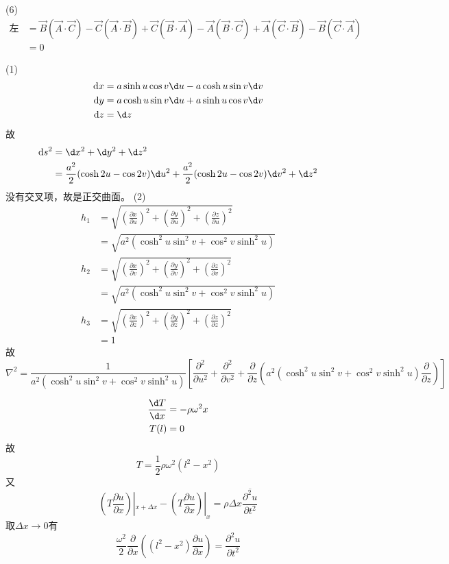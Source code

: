\documentclass{phyasgn}
\begin{document}
\begin{pf}[1]
(6)\begin{align*}
    \text{左边}&=\vec{B}(\vec{A}\cdot\vec{C})-\vec{C}(\vec{A}\cdot\vec{B})+\vec{C}(\vec{B}\cdot\vec{A})-\vec{A}(\vec{B}\cdot\vec{C})+\vec{A}(\vec{C}\cdot\vec{B})-\vec{B}(\vec{C}\cdot\vec{A})\\
    &=0
\end{align*}
\end{pf}\par

\begin{sol}[2]
    (1)\begin{align*}
        \text{d} x&=a\sinh u\cos v\d u-a\cosh u\sin v\d v\\
        \text{d} y&=a\cosh u\sin v\d u+a\sinh u\cos v\d v\\
        \text{d} z&=\d z
    \end{align*}
    故
    \begin{align*}
        \text{d}s^2&=\d x^2+\d y^2+\d z^2\\
        &=\frac{a^2}{2}(\cosh2u-\cos2v)\d u^2+\frac{a^2}{2}(\cosh2u-\cos2v)\d v^2+\d z^2
    \end{align*}
    没有交叉项，故是正交曲面。
    (2)\begin{align*}
        h_1&=\sqrt{(\frac{\partial x}{\partial u})^2+(\frac{\partial y}{\partial u})^2+(\frac{\partial z}{\partial u})^2}\\
        &=\sqrt{a^2(\cosh^2u\sin^2v+\cos^2v\sinh^2u)}\\
        h_2&=\sqrt{(\frac{\partial x}{\partial v})^2+(\frac{\partial y}{\partial v})^2+(\frac{\partial z}{\partial v})^2}\\
        &=\sqrt{a^2(\cosh^2u\sin^2v+\cos^2v\sinh^2u)}\\
        h_3&=\sqrt{(\frac{\partial x}{\partial z})^2+(\frac{\partial y}{\partial z})^2+(\frac{\partial z}{\partial z})^2}\\
        &=1
    \end{align*}
    故
    $$\nabla^2=\frac{1}{a^2(\cosh^2u\sin^2v+\cos^2v\sinh^2u)}[\frac{\partial^2}{\partial u^2}+\frac{\partial^2}{\partial v^2}+\frac{\partial}{\partial z}(a^2(\cosh^2u\sin^2v+\cos^2v\sinh^2u)\frac{\partial}{\partial z})]$$
\end{sol}\par

\begin{sol}[3]
    \begin{align*}
        \frac{\d T}{\d x}&=-\rho\omega^2x\\
        T(l)&=0\\
    \end{align*}
    故
    $$T=\frac{1}{2}\rho\omega^2(l^2-x^2)$$
    又
    $$(T\frac{\partial u}{\partial x})|_{x+\Delta x}-(T\frac{\partial u}{\partial x})|_{x}=\rho\Delta x\overline{\frac{\partial^2u}{\partial t^2}}$$
    取$\Delta x\to 0$有
    $$\frac{\omega^2}{2}\frac{\partial}{\partial x}((l^2-x^2)\frac{\partial u}{\partial x})=\frac{\partial^2u}{\partial t^2}$$
\end{sol}\par
\end{document}
